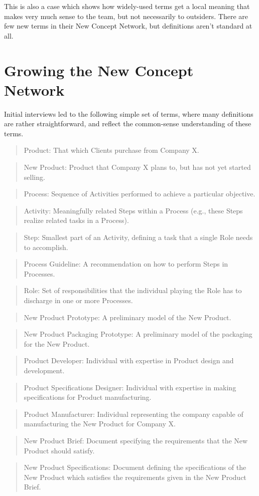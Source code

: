 \documentclass[graybox,envcountchap,sectrefs]{svmono}
\newcommand{\ncnf}{New Concept Network}
\newcommand{\newterm}[1]{\begin{quote}\textsf{#1}\end{quote}}
\newcommand{\nterm}[1]{\textsf{#1}}
\begin{document}
This is also a case which shows how widely-used terms get a local meaning that makes very much sense to the team, but not necessarily to outsiders. There are few new terms in their \ncnf, but definitions aren't standard at all.

\section{Growing the \ncnf}
Initial interviews led to the following simple set of terms, where many definitions are rather straightforward, and reflect the common-sense understanding of these terms.

\newterm{Product: That which \nterm{Clients} purchase from Company X.}

\newterm{New Product: Product that Company X plans to, but has not yet started selling.}

\newterm{Process: Sequence of Activities performed to achieve a particular objective.}

\newterm{Activity: Meaningfully related Steps within a Process (e.g., these Steps realize related tasks in a Process).}

\newterm{Step: Smallest part of an Activity, defining a task that a single Role needs to accomplish.}

\newterm{Process Guideline: A recommendation on how to perform Steps in Processes.}

\newterm{Role: Set of responsibilities that the individual playing the Role has to discharge in one or more Processes.}

\newterm{New Product Prototype: A preliminary model of the New Product.}

\newterm{New Product Packaging Prototype: A preliminary model of the packaging for the New Product.}

\newterm{Product Developer: Individual with expertise in Product design and development.}

\newterm{Product Specifications Designer: Individual with expertise in making specifications for Product manufacturing.}

\newterm{Product Manufacturer: Individual representing the company capable of manufacturing the New Product for Company X.}

\newterm{New Product Brief: Document specifying the requirements that the New Product should satisfy.}

\newterm{New Product Specifications: Document defining the specifications of the New Product which satisfies the requirements given in the New Product Brief.}
\end{document}
